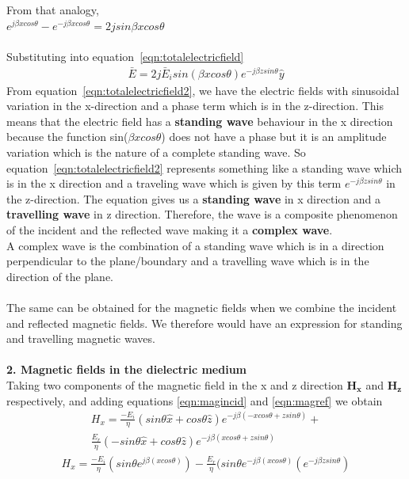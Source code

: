 From that analogy,\\ 
$e^{j\beta xcos\theta} - e^{-j\beta xcos\theta} = 2jsin\beta xcos\theta$\\\\ 
Substituting into equation~\ref{eqn:totalelectricfield}
\begin{align}
\bar{E}=2j \bar{E}_i sin(\beta xcos\theta) e^{-j\beta zsin\theta} \hat{y}
\label{eqn:totalelectricfield2}
\end{align}
From equation~\ref{eqn:totalelectricfield2}, we have the electric fields with sinusoidal variation in the x-direction and a phase term which is in the z-direction. This means that the electric field has a \textbf{standing wave} behaviour in the x direction because the function {sin({$\beta xcos\theta$})} does not have a phase but it is an amplitude variation which is the nature of a complete standing wave. So equation~\ref{eqn:totalelectricfield2} represents something like a standing wave which is in the x direction and a traveling wave which is given by this term \textbf{$e^{-j\beta zsin\theta}$} in the z-direction. The equation gives us a \textbf{standing wave} in x direction and a \textbf{travelling wave} in z direction. Therefore, the wave is a composite phenomenon of the incident and the reflected wave making it a \textbf{complex wave}.\\ A complex wave is the combination of a standing wave which is in a direction perpendicular to the plane/boundary and a travelling wave which is in the direction of the plane.\\\\ 
The same can be obtained for the magnetic fields when we combine the incident and reflected magnetic fields. We therefore
would have an expression for standing and travelling magnetic waves.\\\\ 
\textbf{2. Magnetic fields in the dielectric medium}\\
Taking two components of the magnetic field in the x and z direction
$\boldsymbol{H_x}$ and $\boldsymbol{H_z}$ respectively, and adding equations \ref{eqn:magincid} and \ref{eqn:magref} we obtain
\begin{align*}
H_x = \frac{-E_i}{\eta} (sin\theta \hat{x} + cos\theta \hat{z}) e^{-j\beta( -xcos\theta + zsin\theta)} +\\ 
\frac{E_r}{\eta} \left(-sin\theta \hat{x} + cos\theta \hat{z}\right) e^{-j\beta( xcos\theta + zsin\theta)}
\end{align*}
\begin{align}
H_x = \frac{-E_i}{\eta}(sin\theta e^{j\beta( xcos\theta)} ) - \frac{E_r}{\eta}(sin\theta e^{-j\beta( xcos\theta)} (e^{-j\beta zsin\theta})
\label{eqn:totalmagfieldx}
\end{align}
